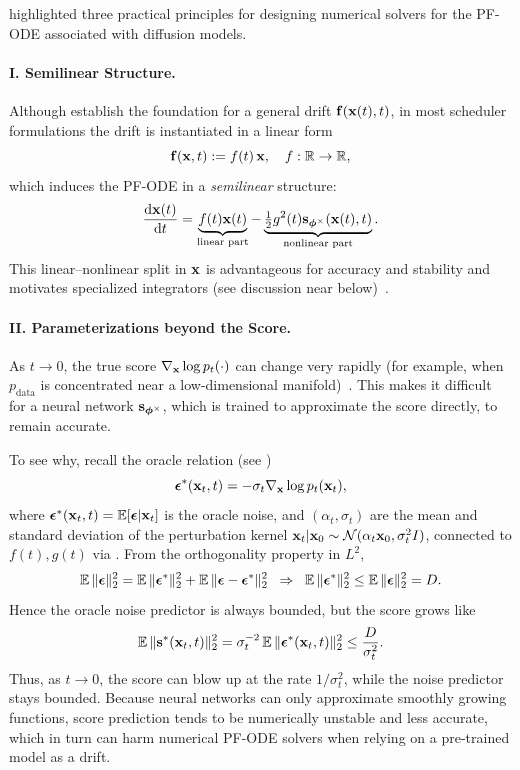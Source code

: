 \citet{zhang2022fast,zhang2023gddim} highlighted three practical principles for designing numerical solvers for the PF-ODE associated with diffusion models.

\paragraph{I. Semilinear Structure.}
Although \citet{song2020score} establish the foundation for a general drift ${\mathbf{f}}({\mathbf{x}}(t),t)$,  
in most scheduler formulations the drift is instantiated in a linear form
\[
{\mathbf{f}}({\mathbf{x}}, t) := f(t)\,{\mathbf{x}}, \quad f:\mathbb{R}\to\mathbb{R},
\]
which induces the PF-ODE in a \emph{semilinear} structure:
\begin{equation}\label{eq:score_pf-ode}
    \frac{\mathop{}\!\mathrm{d}{\mathbf{x}}(t)}{\mathop{}\!\mathrm{d} t}
     = 
    \underbrace{f(t) {\mathbf{x}}(t)}_{\text{linear part}}
     - 
    \underbrace{\tfrac{1}{2} g^2(t) {\mathbf{s}}_{\bm{\phi}^\times}({\mathbf{x}}(t), t)}_{\text{nonlinear part}}.
\end{equation}
This linear–nonlinear split in ${\mathbf{x}}$ is advantageous for accuracy and stability and motivates specialized integrators (see discussion near  below)~\citep{hochbruck2005explicit,hochbruck2010exponential}.



\paragraph{II. Parameterizations beyond the Score.}
As $t \to 0$, the true score $\nabla_{{\mathbf{x}}}\log p_t(\cdot)$ can change very
rapidly (for example, when $p_{\text{data}}$ is concentrated near a
low-dimensional manifold)~\citep{kim2022soft}. This makes it difficult for a neural network
${\mathbf{s}}_{{\bm{\phi}}^\times}$, which is trained to approximate the score directly, to
remain accurate. 

To see why, recall the oracle relation (see )
\[
{\bm{\epsilon}}^*({\mathbf{x}}_t,t) = -\sigma_t \nabla_{{\mathbf{x}}}\log p_t({\mathbf{x}}_t),
\]
where ${\bm{\epsilon}}^*({\mathbf{x}}_t,t)=\mathbb{E}[{\bm{\epsilon}} |{\mathbf{x}}_t]$ is the oracle noise, and $(\alpha_t,\sigma_t)$ are the mean and standard deviation of the
perturbation kernel 
${\mathbf{x}}_t |{\mathbf{x}}_0 \sim \mathcal{N}(\alpha_t {\mathbf{x}}_0, \sigma_t^2 I)$,
connected to $f(t),g(t)$ via . From the orthogonality property in $L^2$,
\[
\mathbb{E}\,\|{\bm{\epsilon}}\|_2^2
=\mathbb{E}\,\|{\bm{\epsilon}}^*\|_2^2+\mathbb{E}\,\|{\bm{\epsilon}}-{\bm{\epsilon}}^*\|_2^2
\;\;\Rightarrow\;\;
\mathbb{E}\,\|{\bm{\epsilon}}^*\|_2^2 \leq \mathbb{E}\,\|{\bm{\epsilon}}\|_2^2 = D.
\]
Hence the oracle noise predictor is always bounded, but the score grows like
\[
\mathbb{E}\,\|{\mathbf{s}}^*({\mathbf{x}}_t,t)\|_2^2
= \sigma_t^{-2}\,\mathbb{E}\,\|{\bm{\epsilon}}^*({\mathbf{x}}_t,t)\|_2^2
 \leq  \frac{D}{\sigma_t^2}.
\]
Thus, as $t\to 0$, the score can blow up at the rate $1/\sigma_t^2$, while the
noise predictor stays bounded. Because neural networks can only approximate
smoothly growing functions, score prediction tends to be numerically unstable
and less accurate, which in turn can harm numerical PF-ODE solvers when relying
on a pre-trained model as a drift.

